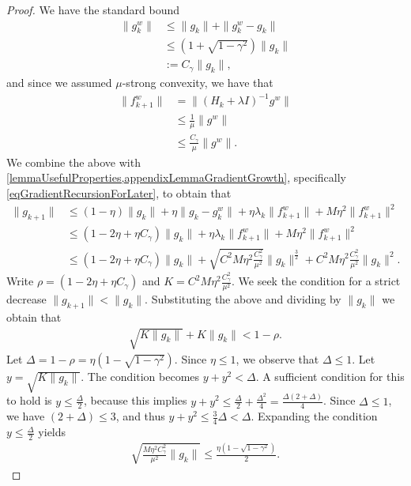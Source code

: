 \documentclass{article}
\theoremstyle{plain}
\theoremstyle{definition}
\theoremstyle{remark}
\begin{document}
\begin{proof}
    We have the standard bound
    \begin{align}
        \|g^w_k\| 
        &\leq \|g_k\| + \|g_k^w - g_k\| \\
        &\leq \left( 1 + \sqrt{1-\gamma^2} \right) \|g_k\| \\
        &:= C_\gamma \|g_k\|,
    \end{align}
    and since we assumed $\mu$-strong convexity, we have that
    \begin{align}
        \|f^w_{k+1}\| 
        &= \|(H_k+\lambda I)^{-1} g^w\| \\
        &\leq \frac{1}{\mu}\|g^w\| \\
        &\leq \frac{C_\gamma}{\mu}\|g^w\|.
    \end{align}
    We combine the above with \cref{lemmaUsefulProperties,appendixLemmaGradientGrowth}, specifically \cref{eqGradientRecursionForLater}, to obtain that
    \begin{align}
        \|g_{k+1}\|
        &\leq (1-\eta) \|g_k\| + \eta \|g_k - g_k^w\| +  \eta \lambda_k \|f^w_{k+1}\| + M \eta^2 \|f^w_{k+1}\|^2 \\
        &\leq (1-2\eta + \eta C_\gamma) \|g_k\| + \eta \lambda_k \|f^w_{k+1}\| + M \eta^2 \|f^w_{k+1}\|^2  \\
        &\leq (1-2\eta + \eta C_\gamma) \|g_k\| + \sqrt{C^2 M \eta^2 \frac{C_\gamma^2}{\mu^2}} \|g_k\|^\frac{3}{2} + C^2 M \eta^2 \frac{C_\gamma^2}{\mu^2}\|g_k\|^2.
    \end{align}
    Write $\rho = (1-2\eta + \eta C_\gamma)$ and $K = C^2 M \eta^2 \frac{C_\gamma^2}{\mu^2}$. We seek the condition for a strict decrease $\| g_{k+1} \| < \|g_k\|$. Substituting the above and dividing by $\|g_k\|$ we obtain that
    \begin{align}
        \sqrt{K \|g_k\|} + K\|g_k\| < 1-\rho.
    \end{align}
    Let $\Delta = 1 - \rho = \eta(1 - \sqrt{1-\gamma^2})$. Since $\eta \leq 1$, we observe that $\Delta \leq 1$. Let $y = \sqrt{K\|g_k\|}$. The condition becomes $y + y^2 < \Delta$. A sufficient condition for this to hold is $y \leq \frac{\Delta}{2}$, because this implies $y+y^2 \leq \frac{\Delta}{2} + \frac{\Delta^2}{4} = \frac{\Delta(2+\Delta)}{4}$. Since $\Delta \leq 1$, we have $(2+\Delta) \leq 3$, and thus $y+y^2 \leq \frac{3}{4}\Delta < \Delta$. Expanding the condition $y \leq \frac{\Delta}{2}$ yields
    \begin{align}
        \sqrt{\frac{M \eta^2 C_\gamma^2}{\mu^2} \|g_k\|} \leq \frac{\eta(1 - \sqrt{1-\gamma^2})}{2}.

\end{align}
\end{proof}
\end{document}
